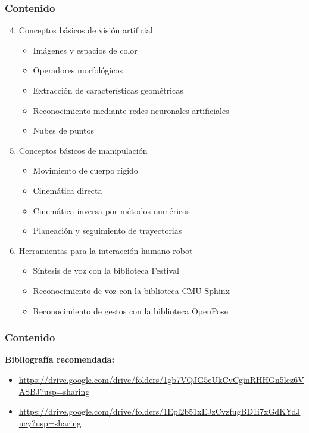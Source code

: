 \begin{frame}\frametitle{Contenido}
  \begin{enumerate}
    \setcounter{enumi}{3}
  \item Conceptos básicos de visión artificial
    \begin{itemize}
    \item Imágenes y espacios de color
    \item Operadores morfológicos
    \item Extracción de características geométricas
    \item Reconocimiento mediante redes neuronales artificiales
    \item Nubes de puntos
    \end{itemize}
  \item Conceptos básicos de manipulación
    \begin{itemize}
    \item Movimiento de cuerpo rígido
    \item Cinemática directa
    \item Cinemática inversa por métodos numéricos
    \item Planeación y seguimiento de trayectorias
    \end{itemize}
  \item Herramientas para la interacción humano-robot
    \begin{itemize}
    \item Síntesis de voz con la biblioteca Festival
    \item Reconocimiento de voz con la biblioteca CMU Sphinx
    \item Reconocimiento de gestos con la biblioteca OpenPose
    \end{itemize}
  \end{enumerate}
\end{frame}

\begin{frame}\frametitle{Contenido}
  \textbf{Bibliografía recomendada:}
  \begin{itemize}
    \item \url{https://drive.google.com/drive/folders/1gb7VQJG5eUkCvCginRHHGn5lez6VASBJ?usp=sharing}
    \item \url{https://drive.google.com/drive/folders/1Epl2b51xEJzCvzfugBD1i7xGdKYdJucy?usp=sharing}
  \end{itemize}
  
\end{frame}

